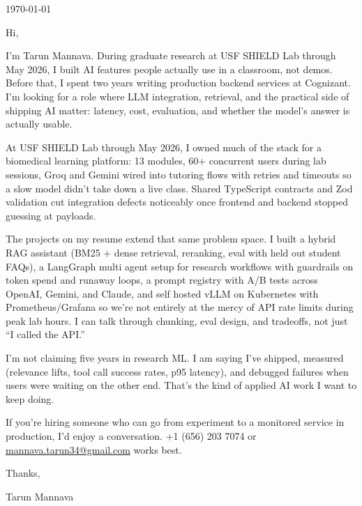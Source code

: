 




\coverLetterHeading

\vspace{14pt}
\noindent\today

\vspace{14pt}
\noindent Hi,

I'm Tarun Mannava. During graduate research at USF SHIELD Lab through May 2026, I built AI features people actually use in a classroom, not demos. Before that, I spent two years writing production backend services at Cognizant. I'm looking for a role where LLM integration, retrieval, and the practical side of shipping AI matter: latency, cost, evaluation, and whether the model's answer is actually usable.

At USF SHIELD Lab through May 2026, I owned much of the stack for a biomedical learning platform: 13 modules, 60+ concurrent users during lab sessions, Groq and Gemini wired into tutoring flows with retries and timeouts so a slow model didn't take down a live class. Shared TypeScript contracts and Zod validation cut integration defects noticeably once frontend and backend stopped guessing at payloads.

The projects on my resume extend that same problem space. I built a hybrid RAG assistant (BM25 + dense retrieval, reranking, eval with held out student FAQs), a LangGraph multi agent setup for research workflows with guardrails on token spend and runaway loops, a prompt registry with A/B tests across OpenAI, Gemini, and Claude, and self hosted vLLM on Kubernetes with Prometheus/Grafana so we're not entirely at the mercy of API rate limits during peak lab hours. I can talk through chunking, eval design, and tradeoffs, not just ``I called the API.''

I'm not claiming five years in research ML. I am saying I've shipped, measured (relevance lifts, tool call success rates, p95 latency), and debugged failures when users were waiting on the other end. That's the kind of applied AI work I want to keep doing.

If you're hiring someone who can go from experiment to a monitored service in production, I'd enjoy a conversation. +1 (656) 203 7074 or \href{mailto:mannava.tarun34@gmail.com}{mannava.tarun34@gmail.com} works best.

Thanks,

\noindent Tarun Mannava



